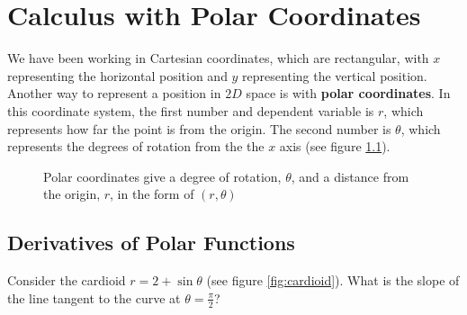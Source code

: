 \chapter{Calculus with Polar Coordinates}

We have been working in Cartesian coordinates, which are rectangular, with $x$ 
representing the horizontal position and $y$ representing the vertical 
position. Another way to represent a position in $2D$ space is with \textbf{
polar coordinates}. In this coordinate system, the 
first number and dependent variable is $r$, which represents how 
far the point is from the origin. The second number is $\theta$, which represents the degrees 
of rotation from the the $x$ axis (see figure \ref{fig:polarex}). 

\begin{figure}[htbp]
\centering
    \label{fig:polarex}
    \caption{Polar coordinates give a degree of rotation, $\theta$, and a 
    distance from the origin, $r$, in the form of $(r, \theta)$}
    \end{figure}

\section{Derivatives of Polar Functions}
Consider the cardioid $r = 2 + \sin{\theta}$ (see figure \ref{fig:cardioid}). What 
is the slope of the line tangent to the curve at $\theta = \frac{\pi}{2}$? 

